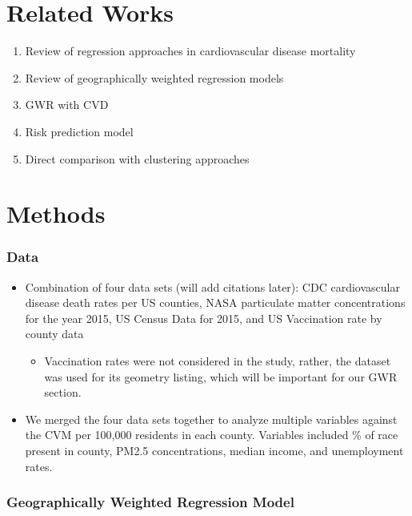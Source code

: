 \documentclass[
]{article}
\providecommand{\tightlist}{%
  \setlength{\itemsep}{0pt}\setlength{\parskip}{0pt}}\usepackage{longtable,booktabs,array}
\begin{document}
\section{Related Works}\label{related-works}

\begin{enumerate}
\def\labelenumi{\arabic{enumi}.}
\item
  Review of regression approaches in cardiovascular disease mortality~
\item
  Review of geographically weighted regression models~
\item
  GWR with CVD~
\item
  Risk prediction model~
\item
  Direct comparison with clustering approaches
\end{enumerate}

\section{Methods}\label{methods}

\subsubsection{Data}\label{data}

\begin{itemize}
\item
  Combination of four data sets (will add citations later): CDC
  cardiovascular disease death rates per US counties, NASA particulate
  matter concentrations for the year 2015, US Census Data for 2015, and
  US Vaccination rate by county data

  \begin{itemize}
  \tightlist
  \item
    Vaccination rates were not considered in the study, rather, the
    dataset was used for its geometry listing, which will be important
    for our GWR section.
  \end{itemize}
\item
  We merged the four data sets together to analyze multiple variables
  against the CVM per 100,000 residents in each county. Variables
  included \% of race present in county, PM2.5 concentrations, median
  income, and unemployment rates.
\end{itemize}

\subsubsection{Geographically Weighted Regression
Model}\label{geographically-weighted-regression-model}
\end{document}

